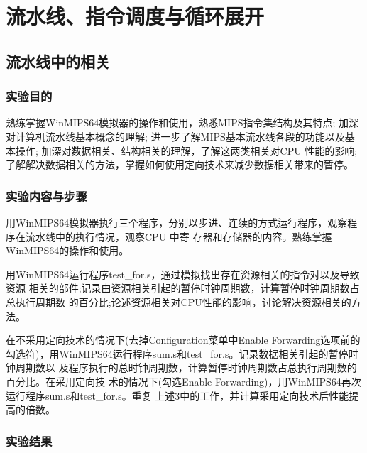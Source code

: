 \documentclass{ctexrep}
\begin{document}

\tableofcontents

\chapter{流水线、指令调度与循环展开}

\section{流水线中的相关}

\subsection{实验目的}
\begin{outline}[enumerate]
    \1 熟练掌握WinMIPS64模拟器的操作和使用，熟悉MIPS指令集结构及其特点;
    \1 加深对计算机流水线基本概念的理解;
    \1 进一步了解MIPS基本流水线各段的功能以及基本操作;
    \1 加深对数据相关、结构相关的理解，了解这两类相关对CPU 性能的影响;
    \1 了解解决数据相关的方法，掌握如何使用定向技术来减少数据相关带来的暂停。
\end{outline}
\subsection{实验内容与步骤}
\begin{outline}[enumerate]
    \1 用WinMIPS64模拟器执行三个程序，分别以步进、连续的方式运行程序，观察程序在流水线中的执行情况，观察CPU 中寄 存器和存储器的内容。熟练掌握WinMIPS64的操作和使用。

    \1 用WinMIPS64运行程序test_for.s，通过模拟找出存在资源相关的指令对以及导致资源 相关的部件;记录由资源相关引起的暂停时钟周期数，计算暂停时钟周期数占总执行周期数 的百分比;论述资源相关对CPU性能的影响，讨论解决资源相关的方法。

    \1 在不采用定向技术的情况下(去掉Configuration菜单中Enable Forwarding选项前的 勾选符)，用WinMIPS64运行程序sum.s和test_for.s。记录数据相关引起的暂停时钟周期数以 及程序执行的总时钟周期数，计算暂停时钟周期数占总执行周期数的百分比。在采用定向技 术的情况下(勾选Enable Forwarding)，用WinMIPS64再次运行程序sum.s和test_for.s。重复 上述3中的工作，并计算采用定向技术后性能提高的倍数。
\end{outline}
\subsection{实验结果}
\end{document}
